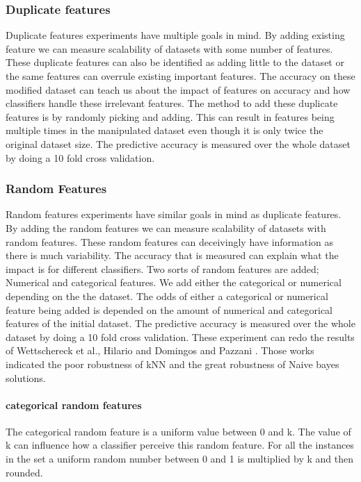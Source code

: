 \documentclass[a4paper,10pt]{article}
\begin{document}
\subsubsection{Duplicate features}
Duplicate features experiments have multiple goals in mind. By adding existing feature we can measure scalability of datasets with some number of features. These duplicate features can also be identified as adding little to the dataset or the same features can overrule existing important features. The accuracy on these modified dataset
can teach us about the impact of features on accuracy and how classifiers handle these irrelevant features. The method to add these duplicate features is by randomly picking and adding. This can result in features being multiple times in the manipulated  dataset even though it is only twice the original dataset size. The predictive accuracy is measured over the whole dataset by doing a 10 fold cross validation.

\subsubsection{Random Features}
Random features experiments have similar goals in mind as duplicate features. By adding the random features we can measure scalability of datasets with random features. These random features can deceivingly have information as there is much variability. The accuracy that is measured can explain what the impact is for different classifiers. Two sorts of random features are added; Numerical and categorical features. We add either the categorical or numerical depending on the the dataset. The odds of either a categorical or numerical feature being added is depended on the amount of numerical and categorical features of the initial dataset. The predictive accuracy is measured over the whole dataset by doing a 10 fold cross validation. These experiment can redo the results of Wettschereck et al., Hilario and Domingos and Pazzani \cite{redundant} \cite{Resil-1} \cite{Red-Bias}. Those works indicated the poor robustness of kNN and the great robustness of Naive bayes solutions.   %


 
\paragraph{categorical random features \newline}
The categorical random feature is a uniform value between 0 and k. The value of k can influence how a classifier perceive this random feature. For all the instances in the set a uniform random number between 0 and 1 is multiplied by k and then rounded. 
\end{document}
